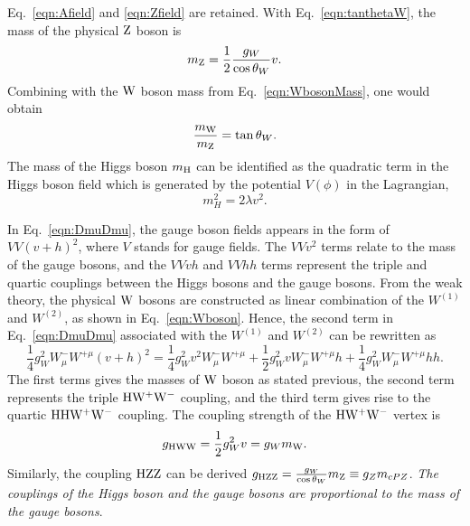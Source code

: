 Eq.~\ref{eqn:Afield} and \ref{eqn:Zfield} are retained.
With Eq.~\ref{eqn:tanthetaW}, the mass of the physical $\mathrm{Z}$ boson is
\begin{equation}
m_{\mathrm{Z}}=\frac{1}{2}\frac{g_{W}}{\cos\theta_{W}}v.
\end{equation}
Combining with the $\mathrm{W}$ boson mass from Eq.~\ref{eqn:WbosonMass}, one would obtain
\begin{equation}
\frac{m_{\mathrm{W}}}{m_{\mathrm{Z}}}=\tan\theta_{W}.
\end{equation}
The mass of the Higgs boson $m_{\mathrm{H}}$ can be identified as the quadratic term in the Higgs boson field which is generated by the potential $V(\phi)$ in the Lagrangian,
\begin{equation}
m_{H}^{2}=2\lambda v^{2}.
\end{equation}

In Eq.~\ref{eqn:DmuDmu}, the gauge boson fields appears in the form of $VV(v+h)^{2}$, where $V$ stands for gauge fields. 
The $VVv^{2}$ terms relate to the mass of the gauge bosons, and the $VVvh$ and $VVhh$ terms represent the triple and quartic couplings between the Higgs bosons and the gauge bosons.
From the weak theory, the physical $\mathrm{W}$ bosons are constructed as linear combination of the $W^{(1)}$ and $W^{(2)}$, as shown in Eq.~\ref{eqn:Wboson}. Hence, the second term in Eq.~\ref{eqn:DmuDmu} associated with the $W^{(1)}$ and $W^{(2)}$ can be rewritten as 
\begin{equation}
\frac{1}{4}g_{W}^{2}W_{\mu}^{-}W^{+\mu}(v+h)^{2}=\frac{1}{4}g_{W}^{2}v^{2}W_{\mu}^{-}W^{+\mu}+\frac{1}{2}g_{W}^{2}vW_{\mu}^{-}W^{+\mu}h+\frac{1}{4}g_{W}^{2}W_{\mu}^{-}W^{+\mu}hh.
\end{equation}
The first terms gives the masses of $\mathrm{W}$ boson as stated previous, the second term represents the triple $\mathrm{H}\mathrm{W}^{+}\mathrm{W}^{-}$ coupling, and
the third term gives rise to the quartic $\mathrm{H}\mathrm{H}\mathrm{W}^{+}\mathrm{W}^{-}$ coupling.
The coupling strength of the $\mathrm{H}\mathrm{W}^{+}\mathrm{W}^{-}$ vertex is 
\begin{equation}
g_{\mathrm{H}\mathrm{W}\mathrm{W}}=\frac{1}{2}g_{W}^{2}v=g_{W}m_{\mathrm{W}}.
\end{equation}
Similarly, the coupling $\mathrm{H}\mathrm{Z}\mathrm{Z}$ can be derived $g_{\mathrm{H}\mathrm{Z}\mathrm{Z}}=\frac{g_{W}}{\cos\theta_{W}}m_{\mathrm{Z}}\equiv g_{Z}m_{cPZ}$.
\emph{The couplings of the Higgs boson and the gauge bosons are proportional to the mass of the gauge bosons}. 

